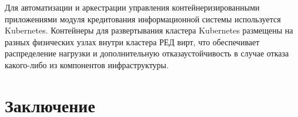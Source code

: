 \documentclass[14pt, a4paper]{extarticle}
\begin{document}
Для автоматизации и аркестрации управления контейнеризированными приложениями модуля кредитования
информационной системы используется Kubernetes. Контейнеры для развертывания кластера Kubernetes
размещены на разных физических узлах внутри кластера РЕД вирт, что обеспечивает распределение нагрузки
и дополнительную отказаустойчивость в случае отказа какого-либо из компонентов инфраструктуры.





\section{Заключение}


\begingroup
\let\itshape\upshape
\sloppy
\raggedright
\printbibliography[title=СПИСОК ИСПОЛЬЗУЕМЫХ ИСТОЧНИКОВ]
{}
\endgroup
\end{document}
